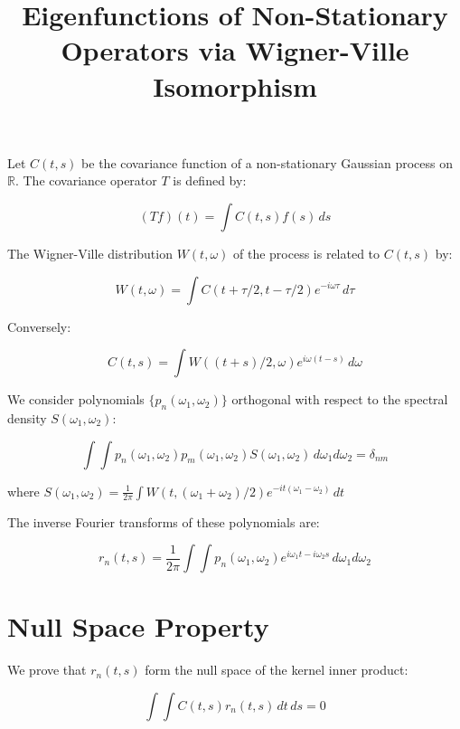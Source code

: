 \documentclass{article}
\begin{document}
\title{Eigenfunctions of Non-Stationary Operators via Wigner-Ville Isomorphism}
\maketitle

\begin{theorem}
Let $C(t,s)$ be the covariance function of a non-stationary Gaussian process on $\mathbb{R}$. The covariance operator $T$ is defined by:

$$(Tf)(t) = \int C(t,s) f(s) \, ds$$

The Wigner-Ville distribution $W(t,\omega)$ of the process is related to $C(t,s)$ by:

$$W(t,\omega) = \int C(t+\tau/2, t-\tau/2) e^{-i\omega\tau} \, d\tau$$

Conversely:

$$C(t,s) = \int W((t+s)/2, \omega) e^{i\omega(t-s)} \, d\omega$$

We consider polynomials $\{p_n(\omega_1,\omega_2)\}$ orthogonal with respect to the spectral density $S(\omega_1,\omega_2)$:

$$\int\int p_n(\omega_1,\omega_2) p_m(\omega_1,\omega_2) S(\omega_1,\omega_2) \, d\omega_1 d\omega_2 = \delta_{nm}$$

where $S(\omega_1,\omega_2) = \frac{1}{2\pi} \int W(t, (\omega_1+\omega_2)/2) e^{-it(\omega_1-\omega_2)} \, dt$

The inverse Fourier transforms of these polynomials are:

$$r_n(t,s) = \frac{1}{2\pi} \int\int p_n(\omega_1,\omega_2) e^{i\omega_1t - i\omega_2s} \, d\omega_1 d\omega_2$$
\end{theorem}

\section{Null Space Property}

We prove that $r_n(t,s)$ form the null space of the kernel inner product:

$$\int\int C(t,s) r_n(t,s) \, dt \, ds = 0$$
\end{document}
